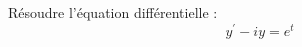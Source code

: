 R\'esoudre l'\'equation diff\'erentielle :
\begin{displaymath}
 y^\prime -i y = e^t
\end{displaymath}
\bigskip
